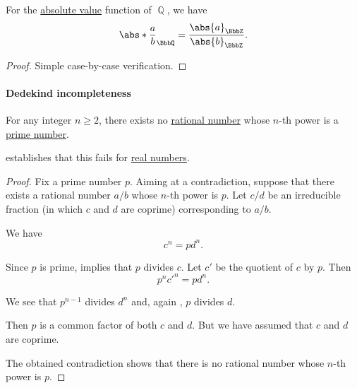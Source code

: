 \begin{proposition}\label{thm:rational_number_absolute_value}\mimprovised
  For the \hyperref[def:totally_ordered_ring_absolute_value]{absolute value} function of \( \BbbQ \), we have
  \begin{equation*}
    \abs*{ \frac a b }_\BbbQ = \frac {\abs{a}_\BbbZ} {\abs{b}_\BbbZ}.
  \end{equation*}
\end{proposition}
\begin{proof}
  Simple case-by-case verification.
\end{proof}

\paragraph{Dedekind incompleteness}

\begin{proposition}\label{thm:nth_root_is_not_rational}
  For any integer \( n \geq 2 \), there exists no \hyperref[def:rational_numbers]{rational number} whose \( n \)-th power is a \hyperref[def:prime_number]{prime number}.
\end{proposition}
\begin{comments}
  \item {} establishes that this fails for \hyperref[def:real_numbers]{real numbers}.
\end{comments}
\begin{proof}
  Fix a prime number \( p \). Aiming at a contradiction, suppose that there exists a rational number \( a / b \) whose \( n \)-th power is \( p \). Let \( c / d \) be an irreducible fraction (in which \( c \) and \( d \) are coprime) corresponding to \( a / b \).

  We have
  \begin{equation*}
    c^n = p d^n.
  \end{equation*}

  Since \( p \) is prime,  implies that \( p \) divides \( c \). Let \( c' \) be the quotient of \( c \) by \( p \). Then
  \begin{equation*}
    p^n c'^n = p d^n.
  \end{equation*}

  We see that \( p^{n-1} \) divides \( d^n \) and, again , \( p \) divides \( d \).

  Then \( p \) is a common factor of both \( c \) and \( d \). But we have assumed that \( c \) and \( d \) are coprime.

  The obtained contradiction shows that there is no rational number whose \( n \)-th power is \( p \).
\end{proof}

